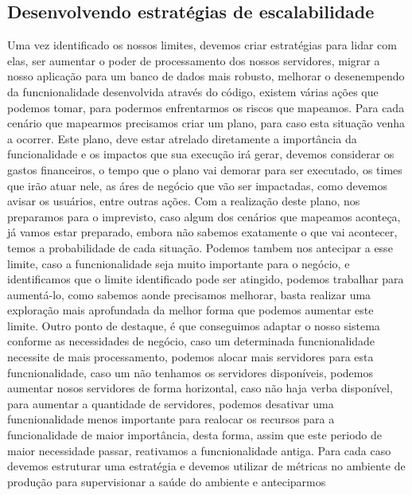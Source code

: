     \subsection{Desenvolvendo estratégias de escalabilidade}
    Uma vez identificado os nossos limites, devemos criar estratégias para lidar
    com elas, ser aumentar o poder de processamento dos nossos servidores,
    migrar a nosso aplicação para um banco de dados mais robusto, melhorar o
    desenempendo da funcnionalidade desenvolvida através do código, existem
    várias ações que podemos tomar, para podermos enfrentarmos os riscos que
    mapeamos. \newline
    Para cada cenário que mapearmos precisamos criar um plano, para caso esta
    situação venha a ocorrer. Este plano, deve estar atrelado diretamente a
    importância da funcionalidade e os impactos que sua execução irá gerar,
    devemos considerar os gastos financeiros, o tempo que o plano vai demorar
    para ser executado, os times que irão atuar nele, as áres de negócio que vão
    ser impactadas, como devemos avisar os usuários, entre outras ações. Com a
    realização deste plano, nos preparamos para o imprevisto, caso algum dos
    cenários que mapeamos aconteça, já vamos estar preparado, embora não sabemos
    exatamente o que vai acontecer, temos a probabilidade de cada situação. Podemos
    tambem nos antecipar a esse limite, caso a funcnionalidade seja muito importante
    para o negócio, e identificamos que o limite identificado pode ser atingido,
    podemos trabalhar para aumentá-lo, como sabemos aonde precisamos melhorar,
    basta realizar uma exploração mais aprofundada da melhor forma que podemos
    aumentar este limite. Outro ponto de destaque, é que conseguimos adaptar o
    nosso sistema conforme as necessidades de negócio, caso um determinada
    funcnionalidade necessite de mais processamento, podemos alocar mais servidores
    para esta funcnionalidade, caso um não tenhamos os servidores disponíveis,
    podemos aumentar nosos servidores de forma horizontal, caso não haja verba
    disponível, para aumentar a quantidade de servidores, podemos desativar uma
    funcnionalidade menos importante para realocar os recursos para a funcionalidade
    de maior importância, desta forma, assim que este periodo de maior necessidade
    passar, reativamos a funcnionalidade antiga. \newline
    Para cada caso devemos estruturar uma estratégia e devemos utilizar de métricas
    no ambiente de produção para supervisionar a saúde do ambiente e anteciparmos
